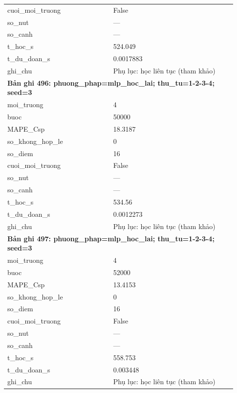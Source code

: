 \begin{longtable}{p{0.43\linewidth}p{0.50\linewidth}}
cuoi\_\allowbreak moi\_\allowbreak truong & False \\
so\_\allowbreak nut & — \\
so\_\allowbreak canh & — \\
t\_\allowbreak hoc\_\allowbreak s & 524.049 \\
t\_\allowbreak du\_\allowbreak doan\_\allowbreak s & 0.0017883 \\
ghi\_\allowbreak chu & Phụ lục: học liên tục (tham khảo) \\
\midrule
\multicolumn{2}{p{0.95\linewidth}}{\textbf{Bản ghi 496: phuong\_phap=mlp\_hoc\_lai; thu\_tu=1-2-3-4; seed=3}} \\
moi\_\allowbreak truong & 4 \\
buoc & 50000 \\
MAPE\_\allowbreak Csp & 18.3187 \\
so\_\allowbreak khong\_\allowbreak hop\_\allowbreak le & 0 \\
so\_\allowbreak diem & 16 \\
cuoi\_\allowbreak moi\_\allowbreak truong & False \\
so\_\allowbreak nut & — \\
so\_\allowbreak canh & — \\
t\_\allowbreak hoc\_\allowbreak s & 534.56 \\
t\_\allowbreak du\_\allowbreak doan\_\allowbreak s & 0.0012273 \\
ghi\_\allowbreak chu & Phụ lục: học liên tục (tham khảo) \\
\midrule
\multicolumn{2}{p{0.95\linewidth}}{\textbf{Bản ghi 497: phuong\_phap=mlp\_hoc\_lai; thu\_tu=1-2-3-4; seed=3}} \\
moi\_\allowbreak truong & 4 \\
buoc & 52000 \\
MAPE\_\allowbreak Csp & 13.4153 \\
so\_\allowbreak khong\_\allowbreak hop\_\allowbreak le & 0 \\
so\_\allowbreak diem & 16 \\
cuoi\_\allowbreak moi\_\allowbreak truong & False \\
so\_\allowbreak nut & — \\
so\_\allowbreak canh & — \\
t\_\allowbreak hoc\_\allowbreak s & 558.753 \\
t\_\allowbreak du\_\allowbreak doan\_\allowbreak s & 0.003448 \\
ghi\_\allowbreak chu & Phụ lục: học liên tục (tham khảo) \\

\end{longtable}
